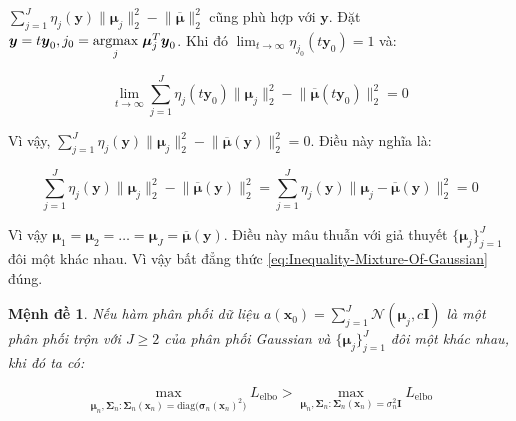\documentclass[14pt, a4paper]{article}
\numberwithin{equation}{section}
\numberwithin{figure}{section}
\newtheorem{md}{Mệnh đề}
\numberwithin{dl}{section}
\numberwithin{md}{section}
\numberwithin{bd}{section}
\numberwithin{dn}{section}
\numberwithin{hq}{section}
\begin{document}
    $\sum_{j=1}^J \eta_j (\boldsymbol{y}) \lVert \boldsymbol{\mu}_j \rVert_2^2 - \lVert \overline{\boldsymbol{\mu}} \rVert_2^2$ cũng phù hợp với $\boldsymbol{y}$.
    Đặt $\boldsymbol{y} = t\boldsymbol{y}_0, j_0 = \underset{j}{\mathrm{argmax}} \thickspace \boldsymbol{\mu}_j^T \boldsymbol{y}_0$. Khi đó $\lim_{t \rightarrow \infty} \eta_{j_0} (t \boldsymbol{y}_0)=1$ và:

    \begin{equation}
        \lim_{t \rightarrow \infty} \sum_{j=1}^J \eta_j (t \boldsymbol{y}_0) \lVert \boldsymbol{\mu}_j \rVert_2^2 - \lVert \overline{\boldsymbol{\mu}} (t \boldsymbol{y}_0) \rVert_2^2 =0
    \end{equation}

    Vì vậy, $\sum_{j=1}^J \eta_j (\boldsymbol{y}) \lVert \boldsymbol{\mu}_j \rVert_2^2 - \lVert \overline{\boldsymbol{\mu}} (\boldsymbol{y})  \rVert_2^2 = 0$. Điều này nghĩa là:

    \begin{equation}
        \sum_{j=1}^J \eta_j (\boldsymbol{y}) \lVert \boldsymbol{\mu}_j \rVert_2^2 - \lVert \overline{\boldsymbol{\mu}} (\boldsymbol{y}) \rVert_2^2 = \sum_{j=1}^J \eta_j (\boldsymbol{y}) \lVert \boldsymbol{\mu}_j - \overline{\boldsymbol{\mu}} (\boldsymbol{y}) \rVert_2^2 = 0
    \end{equation}

    Vì vậy $\boldsymbol{\mu}_1 = \boldsymbol{\mu}_2 = \dots = \boldsymbol{\mu}_J = \overline{\boldsymbol{\mu}} (\boldsymbol{y})$.
    Điều này mâu thuẫn với giả thuyết $\lbrace \boldsymbol{\mu}_j \rbrace_{j=1}^J$ đôi một khác nhau.
    Vì vậy bất đẳng thức \ref{eq:Inequality-Mixture-Of-Gaussian} đúng.

    \begin{md}
        Nếu hàm phân phối dữ liệu $a(\boldsymbol{x}_0)=\sum_{j=1}^J \mathcal{N} (\boldsymbol{\mu}_j, c \boldsymbol{I})$ là một phân phối trộn với $J \geq 2$ của phân phối Gaussian và $\lbrace \boldsymbol{\mu}_j \rbrace_{j=1}^J$ đôi một khác nhau, khi đó ta có:

        \begin{equation}
            \max_{\boldsymbol{\mu}_n, \boldsymbol{\Sigma}_n:\boldsymbol{\Sigma}_n(\boldsymbol{x}_n)=\mathrm{diag}\big( \boldsymbol{\sigma}_n (\boldsymbol{x}_n)^2 \big)} L_{\mathrm{elbo}} > \max_{\boldsymbol{\mu}_n, \boldsymbol{\Sigma}_n:\boldsymbol{\Sigma}_n(\boldsymbol{x}_n)=\sigma_n^2 \boldsymbol{I}} L_{\mathrm{elbo}}
        \end{equation}
    \end{md}
\end{document}
